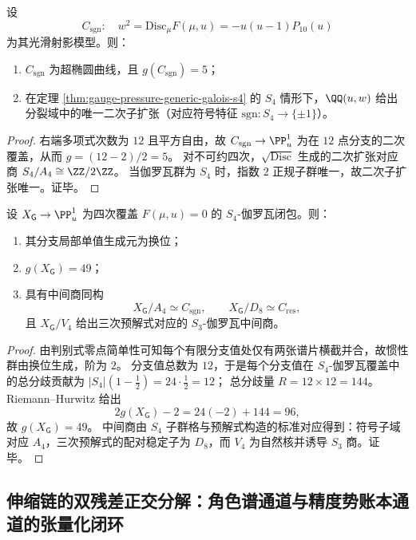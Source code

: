 \begin{theorem}[判别式二次子覆叠与唯一二次子扩张]\label{thm:gauge-pressure-sign-cover-genus5}
设
\[
C_{\mathrm{sgn}}:\quad w^2=\mathrm{Disc}_{\mu}F(\mu,u)=-u(u-1)P_{10}(u)
\]
为其光滑射影模型。则：
\begin{enumerate}
  \item \(C_{\mathrm{sgn}}\) 为超椭圆曲线，且 \(g(C_{\mathrm{sgn}})=5\)；
  \item 在定理 \ref{thm:gauge-pressure-generic-galois-s4} 的 \(S_4\) 情形下，\(\QQ(u,w)\) 给出分裂域中的唯一二次子扩张（对应符号特征 \(\mathrm{sgn}:S_4\to\{\pm1\}\)）。
\end{enumerate}
\end{theorem}
\begin{proof}
右端多项式次数为 \(12\) 且平方自由，故 \(C_{\mathrm{sgn}}\to\PP^1_u\) 为在 \(12\) 点分支的二次覆盖，从而
\(
g=(12-2)/2=5
\)。
对不可约四次，\(\sqrt{\mathrm{Disc}}\) 生成的二次扩张对应商 \(S_4/A_4\cong \ZZ/2\ZZ\)。
当伽罗瓦群为 \(S_4\) 时，指数 \(2\) 正规子群唯一，故二次子扩张唯一。证毕。
\end{proof}

\begin{theorem}\label{thm:gauge-pressure-s4-closure-genus49}
设 \(X_{\mathsf G}\to\PP^1_u\) 为四次覆盖 \(F(\mu,u)=0\) 的 \(S_4\)-伽罗瓦闭包。则：
\begin{enumerate}
  \item 其分支局部单值生成元为换位；
  \item \(g(X_{\mathsf G})=49\)；
  \item 具有中间商同构
  \[
  X_{\mathsf G}/A_4\simeq C_{\mathrm{sgn}},\qquad
  X_{\mathsf G}/D_8\simeq C_{\mathrm{res}},
  \]
  且 \(X_{\mathsf G}/V_4\) 给出三次预解式对应的 \(S_3\)-伽罗瓦中间商。
\end{enumerate}
\end{theorem}
\begin{proof}
由判别式零点简单性可知每个有限分支值处仅有两张谱片横截并合，故惯性群由换位生成，阶为 \(2\)。
分支值总数为 \(12\)，于是每个分支值在 \(S_4\)-伽罗瓦覆盖中的总分歧贡献为
\(
|S_4|(1-\frac12)=24\cdot\frac12=12
\)；
总分歧量 \(R=12\times 12=144\)。
Riemann--Hurwitz 给出
\[
2g(X_{\mathsf G})-2=24(-2)+144=96,
\]
故 \(g(X_{\mathsf G})=49\)。
中间商由 \(S_4\) 子群格与预解式构造的标准对应得到：符号子域对应 \(A_4\)，三次预解式的配对稳定子为 \(D_8\)，而 \(V_4\) 为自然核并诱导 \(S_3\) 商。证毕。
\end{proof}

\subsection{伸缩链的双残差正交分解：角色谱通道与精度势账本通道的张量化闭环}\label{subsec:dilation-character-precision-tensor}

